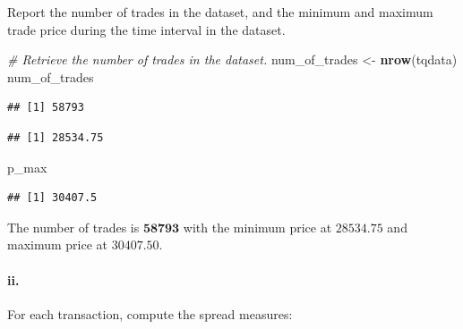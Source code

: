 \documentclass[
]{article}
\newenvironment{Shaded}{\begin{snugshade}}{\end{snugshade}}
\newcommand{\CommentTok}[1]{\textcolor[rgb]{0.56,0.35,0.01}{\textit{#1}}}
\newcommand{\FunctionTok}[1]{\textcolor[rgb]{0.13,0.29,0.53}{\textbf{#1}}}
\newcommand{\NormalTok}[1]{#1}
\newcommand{\OtherTok}[1]{\textcolor[rgb]{0.56,0.35,0.01}{#1}}
\newcommand{\SpecialCharTok}[1]{\textcolor[rgb]{0.81,0.36,0.00}{\textbf{#1}}}
\begin{document}
Report the number of trades in the dataset, and the minimum and maximum
trade price during the time interval in the dataset.

\begin{Shaded}
\begin{Highlighting}[]
\CommentTok{\# Retrieve the number of trades in the dataset.}
\NormalTok{num\_of\_trades }\OtherTok{\textless{}{-}} \FunctionTok{nrow}\NormalTok{(tqdata)}
\NormalTok{num\_of\_trades}
\end{Highlighting}
\end{Shaded}

\begin{verbatim}
## [1] 58793
\end{verbatim}

\begin{Shaded}
\end{Shaded}

\begin{verbatim}
## [1] 28534.75
\end{verbatim}

\begin{Shaded}
\begin{Highlighting}[]
\NormalTok{p\_max}
\end{Highlighting}
\end{Shaded}

\begin{verbatim}
## [1] 30407.5
\end{verbatim}

The number of trades is \(\mathbf{58793}\) with the minimum price at
\(\mathbf{28534.75}\) and maximum price at \(\mathbf{30407.50}\).

\paragraph{ii.}\label{ii.}

For each transaction, compute the spread measures:
\end{document}
